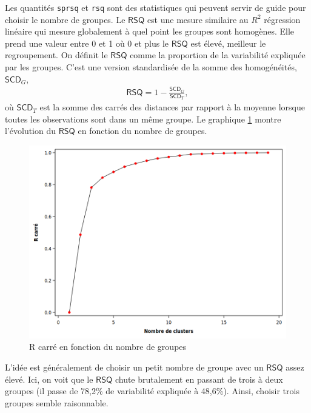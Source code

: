 \documentclass[
  11pt,
  letterpaper,
]{book}
\theoremstyle{definition}
\theoremstyle{definition}
\theoremstyle{definition}
\theoremstyle{remark}
\begin{document}
Les quantités \texttt{sprsq} et \texttt{rsq} sont des statistiques qui peuvent servir de guide pour choisir le nombre de groupes. Le \(\mathsf{RSQ}\) est une mesure similaire au \(R^2\) régression linéaire qui mesure globalement à quel point les groupes sont homogènes. Elle prend une valeur entre 0 et 1 où 0 et plus le \(\mathsf{RSQ}\) est élevé, meilleur le regroupement.
On définit le \(\mathsf{RSQ}\) comme la proportion de la variabilité expliquée par les groupes. C'est une version standardisée de la somme des homogénéités, \(\mathsf{SCD}_G\),
\begin{align*}
\mathsf{RSQ} = 1-\frac{\mathsf{SCD}_G}{\mathsf{SCD}_T},
\end{align*}
où \(\mathsf{SCD}_T\) est la somme des carrés des distances par rapport à la moyenne lorsque toutes les observations sont dans un même groupe. Le graphique \ref{fig:fig4-e4} montre l'évolution du \(\mathsf{RSQ}\) en fonction du nombre de groupes.

\begin{figure}

{\centering \includegraphics[width=0.8\linewidth]{figures/04-clustering-e4} 

}

\caption{R carré en fonction du nombre de groupes}\label{fig:fig4-e4}
\end{figure}

L'idée est généralement de choisir un petit nombre de groupe avec un \(\mathsf{RSQ}\) assez élevé.
Ici, on voit que le \(\mathsf{RSQ}\) chute brutalement en passant de trois à deux groupes (il passe de 78,2\% de variabilité expliquée à 48,6\%). Ainsi, choisir trois groupes semble raisonnable.
\end{document}
